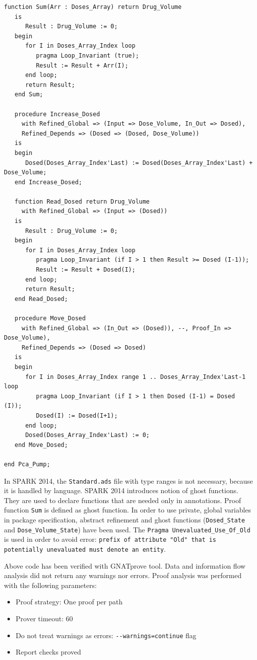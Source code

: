 \begin{lstlisting}[language=ada2012, frame=single, gobble=0, caption={Sequential module for dose monitoring in SPARK 2014}, label={listing:pca_pump_move_dosed_unit_spark2014}]
   function Sum(Arr : Doses_Array) return Drug_Volume
   is
      Result : Drug_Volume := 0;
   begin
      for I in Doses_Array_Index loop
         pragma Loop_Invariant (true);
         Result := Result + Arr(I);
      end loop;
      return Result;
   end Sum;

   procedure Increase_Dosed
     with Refined_Global => (Input => Dose_Volume, In_Out => Dosed),
     Refined_Depends => (Dosed => (Dosed, Dose_Volume))
   is
   begin
      Dosed(Doses_Array_Index'Last) := Dosed(Doses_Array_Index'Last) + Dose_Volume;
   end Increase_Dosed;

   function Read_Dosed return Drug_Volume
     with Refined_Global => (Input => (Dosed))
   is
      Result : Drug_Volume := 0;
   begin
      for I in Doses_Array_Index loop
         pragma Loop_Invariant (if I > 1 then Result >= Dosed (I-1));
         Result := Result + Dosed(I);
      end loop;
      return Result;
   end Read_Dosed;

   procedure Move_Dosed
     with Refined_Global => (In_Out => (Dosed)), --, Proof_In => Dose_Volume),
     Refined_Depends => (Dosed => Dosed)
   is
   begin
      for I in Doses_Array_Index range 1 .. Doses_Array_Index'Last-1 loop
         pragma Loop_Invariant (if I > 1 then Dosed (I-1) = Dosed (I));
         Dosed(I) := Dosed(I+1);
      end loop;
      Dosed(Doses_Array_Index'Last) := 0;
   end Move_Dosed;

end Pca_Pump;
\end{lstlisting}
\doublespacing

In SPARK 2014, the \lstinline{Standard.ads} file with type ranges is not necessary, because it is handled by language. SPARK 2014 introduces notion of ghost functions. They are used to declare functions that are needed only in annotations. Proof function \lstinline{Sum} is defined as ghost function. In order to use private, global variables in package specification, abstract refinement and ghost functions (\lstinline{Dosed_State} and \lstinline{Dose_Volume_State}) have been used. The \lstinline{Pragma Unevaluated_Use_Of_Old} is used in order to avoid error: \lstinline{prefix of attribute "Old" that is potentially unevaluated must denote an entity}.

Above code has been verified with GNATprove tool. Data and information flow analysis did not return any warnings nor errors. Proof analysis was performed with the following parameters:
\begin{itemize}
    \item Proof strategy: One proof per path
    \item Prover timeout: 60
    \item Do not treat warnings as errors: \lstinline{--warnings=continue} flag
    \item Report checks proved
\end{itemize}

